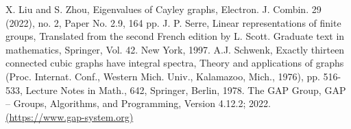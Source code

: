 \documentclass[12pt,a4paper]{article}
\begin{document}
\begin{thebibliography}{Dillo 150}
 X. Liu and S. Zhou, Eigenvalues of Cayley graphs, Electron. J. Combin. 29 (2022), no. 2, Paper No. 2.9, 164 pp.
 J. P. Serre, Linear representations of finite groups, Translated from the second French edition by
L. Scott. Graduate text in mathematics, Springer, Vol. 42. New York, 1997.
 A.J. Schwenk, Exactly thirteen connected cubic graphs have integral spectra, Theory
and applications of graphs (Proc. Internat. Conf., Western Mich. Univ., Kalamazoo,
Mich., 1976), pp. 516-533, Lecture Notes in Math., 642, Springer, Berlin, 1978.
 The GAP Group, GAP -- Groups, Algorithms, and Programming, Version 4.12.2; 2022. \href{https://www.gap-system.org}{(https://www.gap-system.org)}
\end{thebibliography}
\end{document}
